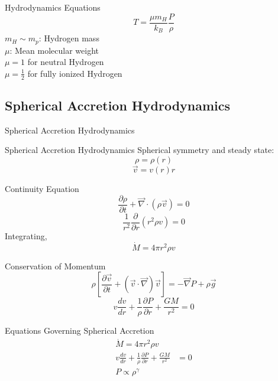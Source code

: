 \documentclass{beamer}
\begin{document}
\begin{darkframes}
\begin{frame}{Hydrodynamics Equations}
	\[ T = 	\frac{\mu m_H}{k_B} \frac{P}{\rho} \]
	\pause
	\bigskip
	\justify
	$m_H \sim m_p$: Hydrogen mass\\
	\bigskip
	\pause
	$\mu$: Mean molecular weight\\
	$\mu = 1$ for neutral Hydrogen\\
	$\mu = \frac{1}{2}$ for fully ionized Hydrogen
\end{frame}


\subsection{Spherical Accretion Hydrodynamics}
\begin{frame}
	\huge
    {Spherical Accretion Hydrodynamics}
\end{frame}

\begin{frame}{Spherical Accretion Hydrodynamics}
    Spherical symmetry and steady state:
    \pause
    \[ \rho = \rho(r) \]
    \[ \vec{v} = v(r) \hat{r}\]
\end{frame}

\begin{frame}{Continuity Equation}
    \[ \frac{\partial \rho}{\partial t} + \vec{\nabla} \cdot \left( \rho \vec{v}\right) = 0 \]
    \pause
    \[ \frac{1}{r^2} \frac{\partial}{\partial r} \left( r^2 \rho v \right) = 0\]
    \pause
    Integrating,
    \pause
    \[ \dot{M} = 4\pi r^2 \rho v \]
\end{frame}

\begin{frame}{Conservation of Momentum}
    \[ \rho \left[\frac{\partial \vec{v}}{\partial t} + \left( \vec{v} \cdot \vec{\nabla} \right) \vec{v} \right]
	= -\vec{\nabla} P + \rho \vec{g} \]
    \pause
    \[ v \frac{dv}{dr} + \frac{1}{\rho} \frac{\partial P}{\partial r} + \frac{GM}{r^2} = 0\]
\end{frame}

\begin{frame}{Equations Governing Spherical Accretion}
	\begin{align*}
	\dot{M} = 4\pi r^2 \rho v & \\
	v \frac{dv}{dr} + \frac{1}{\rho} \frac{\partial P}{\partial r} + \frac{GM}{r^2} &= 0 \\
	P \propto \rho^\gamma &
	\end{align*}	    
\end{frame}


\end{darkframes}
\end{document}
